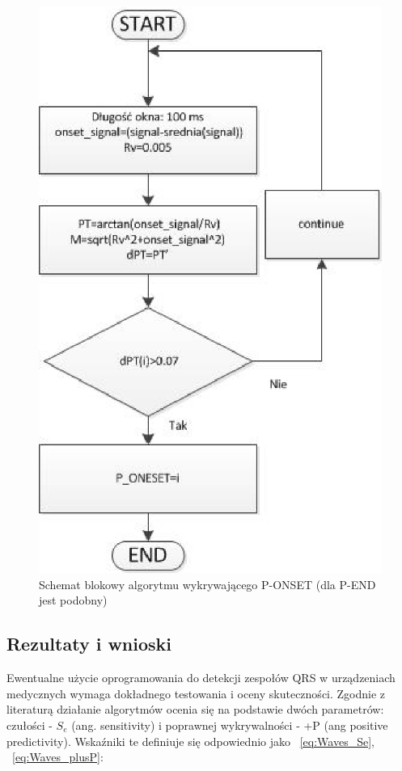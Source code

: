 \begin{figure}[H]
\centering
\includegraphics[scale=0.8] {Waves/img/schemat_P_oneset.eps}
\caption{Schemat blokowy algorytmu wykrywającego P-ONSET (dla P-END jest podobny)  }
\label{fig:Waves_SchemPOnset}
\end{figure}

\subsection{Rezultaty i wnioski}
Ewentualne użycie oprogramowania do detekcji zespołów QRS w urządzeniach medycznych wymaga dokładnego testowania i oceny skuteczności. Zgodnie z literaturą \cite{Waves_TPoSQD} działanie algorytmów ocenia się na podstawie dwóch parametrów: czułości - $S_e$ (ang. sensitivity) i poprawnej wykrywalności - +P (ang positive predictivity). Wskaźniki te definiuje się odpowiednio jako ~\ref{eq:Waves_Se}, ~\ref{eq:Waves_plusP}:

